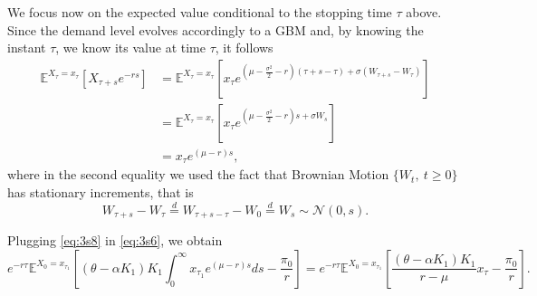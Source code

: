 

We focus now on the expected value conditional to the stopping time $\tau$ above. Since the demand level evolves accordingly to a GBM and, by knowing the instant $\tau$, we know its value at time $\tau$, it follows 
\begin{align}
\mathds{E}^{X_\tau=x_\tau}  \left[  X_{\tau+s}e^{-rs}  \right] &=\mathds{E}^{X_\tau=x_\tau}  \left[  x_{\tau} e^{\left( \mu- \frac{\sigma^2}{2}-r \right)   (\tau+s-\tau)+\sigma( W_{\tau+s}-W_\tau)}  \right]  \nonumber \\
&=\mathds{E}^{X_\tau=x_\tau}  \left[  x_{\tau} e^{\left( \mu- \frac{\sigma^2}{2}-r \right) s+\sigma W_{s}}   \right]  \nonumber \\
&= x_{\tau} e^{\left( \mu-r \right)s},
\label{eq:3s8}
\end{align}
where in the second equality we used the fact that Brownian Motion $\{ W_t, \ t \geq0 \}$ has stationary increments, that is 
$$W_{\tau+s}-W_\tau \overset{d}{=} W_{\tau+s-\tau}-W_0 \overset{d}{=} W_{s} \sim \mathcal{N}(0,s).$$




Plugging \eqref{eq:3s8} in \eqref{eq:3s6}, we obtain
\begin{equation}
e^{-r\tau} \mathds{E}^{X_0=x_{\tau_1}} \left[   (\theta-\alpha K_1)K_1 \int_{0}^\infty x_{\tau_1} e^{\left( \mu-r \right)s} ds -\frac{\pi_0}{r} \right] = e^{-r\tau} \mathds{E}^{X_0=x_{\tau_1}} \left[   \frac{(\theta-\alpha K_1)K_1}{r-\mu} x_{\tau} -\frac{\pi_0}{r} \right].
\label{eq:3s9}
\end{equation}

